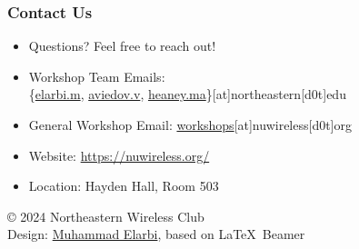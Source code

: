 \documentclass{beamer}
\begin{document}
\begin{frame}
    \frametitle{Contact Us}
    \begin{itemize}
        \item Questions? Feel free to reach out!
        \item Workshop Team Emails: \\
        \{\href{mailto:elarbi.m@northeastern.edu}{elarbi.m}, 
        \href{mailto:aviedov.v@northeastern.edu}{aviedov.v}, 
        \href{mailto:heaney.ma@northeastern.edu}{heaney.ma}\}[at]northeastern[d0t]edu
        \item General Workshop Email: \href{mailto:workshops@nuwireless.org}{workshops}[at]nuwireless[d0t]org
        \item Website: \url{https://nuwireless.org/}
        \item Location: Hayden Hall, Room 503
    \end{itemize}
    \vspace{1cm}
    \begin{flushright}
        \footnotesize{© 2024 Northeastern Wireless Club} \\
        \footnotesize{Design: \href{https://melarbi.com}{Muhammad Elarbi}, based on \LaTeX\ Beamer}
    \end{flushright}
\end{frame}

\end{document}
